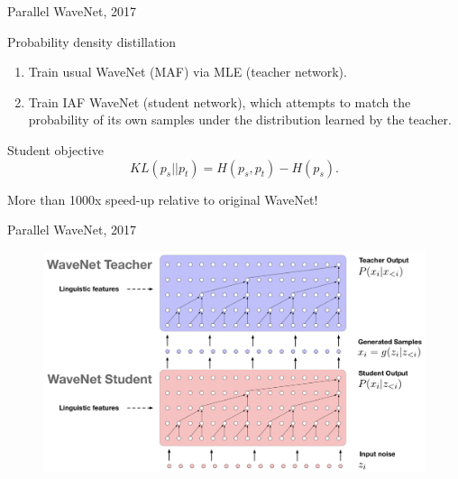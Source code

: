 \begin{frame}{Parallel WaveNet, 2017}
	\begin{block}{Probability density distillation}
		\begin{enumerate}
			\item Train usual WaveNet (MAF) via MLE (teacher network).
			\item Train IAF WaveNet (student network), which attempts to match the probability of its own samples under the distribution learned by the teacher.
		\end{enumerate}
	\end{block}
	\begin{block}{Student objective}
		\[
		KL(p_s || p_t) = H(p_s, p_t) - H(p_s).
		\]
	\end{block}
	More than 1000x speed-up relative to original WaveNet!
\end{frame}
\begin{frame}{Parallel WaveNet, 2017}
	\begin{figure}
		\centering
		\includegraphics[width=\linewidth]{figs/parallel_wavenet.png}
	\end{figure}

\end{frame}
